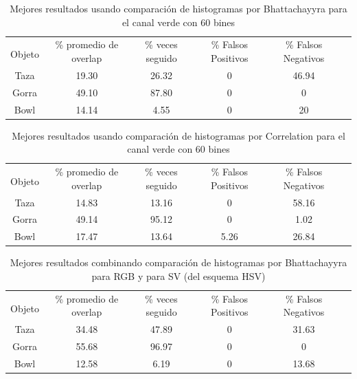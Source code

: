 \begin{table}[h]
	\centering
	\begin{tabular}{|c|c|c|c|c|c|}
	    \hline
	    & \multirow{2}{2.4cm}{\% promedio de overlap} & \multirow{2}{2cm}{\% veces seguido} & \multirow{2}{1.6cm}{\% Falsos Positivos} & \multirow{2}{1.6cm}{\% Falsos Negativos}\\
		Objeto & & & &\\
	    \hline
	    Taza   & 19.30      & 26.32   & 0       & 46.94 \\
	    \hline
	    Gorra  & 49.10      & 87.80   & 0       & 0     \\
	    \hline
	    Bowl   & 14.14      &  4.55   & 0       & 20    \\
	    \hline
    \end{tabular}
	\caption{Mejores resultados usando comparación de histogramas por Bhattachayyra para el canal verde con 60 bines}
	\label{pruebas_definitivas_bhatta_green}
\end{table}

\begin{table}[h]
	\centering
	\begin{tabular}{|c|c|c|c|c|c|}
	    \hline
	    & \multirow{2}{2.4cm}{\% promedio de overlap} & \multirow{2}{2cm}{\% veces seguido} & \multirow{2}{1.6cm}{\% Falsos Positivos} & \multirow{2}{1.6cm}{\% Falsos Negativos}\\
		Objeto & & & &\\
	    \hline
	    Taza   & 14.83      & 13.16     & 0      & 58.16 \\
	    \hline
	    Gorra  & 49.14      & 95.12     & 0      & 1.02  \\
	    \hline
	    Bowl   & 17.47      & 13.64     & 5.26   & 26.84 \\
	    \hline
    \end{tabular}
	\caption{Mejores resultados usando comparación de histogramas por Correlation para el canal verde con 60 bines}
	\label{pruebas_definitivas_correl_green}
\end{table}

\begin{table}[h]
	\centering
	\begin{tabular}{|c|c|c|c|c|c|}
	    \hline
	    & \multirow{2}{2.4cm}{\% promedio de overlap} & \multirow{2}{2cm}{\% veces seguido} & \multirow{2}{1.6cm}{\% Falsos Positivos} & \multirow{2}{1.6cm}{\% Falsos Negativos}\\
		Objeto & & & &\\
	    \hline
	    Taza   & 34.48      & 47.89     & 0        & 31.63  \\
	    \hline
	    Gorra  & 55.68      & 96.97     & 0        & 0      \\
	    \hline
	    Bowl   & 12.58      &  6.19     & 0        & 13.68  \\
	    \hline
    \end{tabular}
	\caption{Mejores resultados combinando comparación de histogramas por Bhattachayyra para RGB y para SV (del esquema HSV)}
	\label{tab:tabla_rgb}
\end{table}



